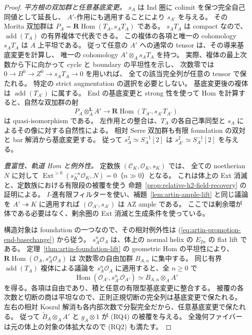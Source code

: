 \begin{proof}
\emph{平方根の双加群と任意基底変更。}
$s_A$ は Ind 圏に colimit を保つ完全自己同値として延長し、
$A'$-作用にも適用することにより $s_{A'}$ を与える。
その Morita 双加群は $P_A=\mathbf R\operatorname{Hom}(T_A,s_AT_A)$ である。
$s_AT_A$ は compact なので、$\operatorname{add}(T_A)$ の有界複体で代表できる。
この複体の各項と唯一の cohomology $s_AT_A$ は $A$ 上平坦である。
従って任意の $A'$ への通常の tensor は、その導来基底変更を計算し、
唯一の cohomology $A'\otimes_A s_AT_A$ を持つ。
実際、複体の最上次数から下に向かって cycle と boundary の平坦性を示し、
次数零では $0\to B^0\to Z^0\to s_AT_A\to0$ を用いれば、
全ての該当完全列が任意の tensor で保たれる。
特定の strict augmentation の選択を必要としない。
基底変更後の複体は $\operatorname{add}(T_{A'})$ に属する。
End の基底変更と strong 性を使って Hom を計算すると、自然な双加群の射
\[
 P_A\otimes_A^{\mathbf L}A'
 \longrightarrow
 \mathbf R\operatorname{Hom}(T_{A'},s_{A'}T_{A'})
\]
は quasi-isomorphism である。
左作用との整合は、$T_A$ の各自己準同型と $s_A$ によるその像に対する自然性による。
相対 Serre 双加群も有限 foundation の双対と bar 解消から基底変更する。
従って $s_A^2\simeq S_A^{-1}[2]$ は
$s_{A'}^2\simeq S_{A'}^{-1}[2]$ を与える。

\emph{豊富性、軌道 Hom と例外性。}
定数族 $(\mathcal C_K,\mathcal O_K,s_K)$ では、
全ての noetherian $N$ に対して
$\operatorname{Ext}^{>0}(s_K^{-n}\mathcal O_K,N)=0$（$n\gg0$）となる。
これは体上の Ext 消滅と、定数族における有限段の被覆を使う
命題~\ref{prop:relative-h2-field-recovery} の証明による。
$I$-進有限フィルターを使い、補題~\ref{lem:artin-ample-lift} と同じ議論を
$A'\twoheadrightarrow K$ に適用すれば $(\mathcal O_{A'},s_{A'})$ は AZ ample である。
ここでは剰余環が体である必要はなく、剰余圏の Ext 消滅と生成条件を使っている。

構造対象は foundation の一つなので、その相対例外性は
(\ref{eq:artin-promotion-end-basechange}) から従う。
$s_A^n\mathcal O_A$ は、体上の normal helix の $E_{2n}$ の flat lift である。
定理~\ref{thm:artin-foundation-lift} の geometric Hom の平坦性により、
$\mathbf R\operatorname{Hom}(\mathcal O_A,s_A^n\mathcal O_A)$ は
次数零の自由加群 $B_{A,n}$ に集中する。
同じ有界 $\operatorname{add}(T_A)$ 複体による議論を
$s_A^n\mathcal O_A$ に適用すると、全 $n\ge0$ で
\[
 \operatorname{Hom}(\mathcal O_{A'},s_{A'}^n\mathcal O_{A'})
 \simeq B_{A,n}\otimes_A A'
\]
を得る。各項は自由であり、積と任意の有限型基底変更に整合する。
被覆の各次数と切断の商は平坦なので、正則正規切断の完全列は基底変更で保たれる。
左右の相対 Koszul 解消も各内部次数で分裂完全だから、任意基底変更で保たれる。
従って $\widetilde B_A\otimes_A A'$ と $g_A\otimes1$ が (RQ4) の被覆を与える。
全幾何ファイバーは元の体上の対象の体拡大なので (RQ2) も満たす。


\end{proof}
